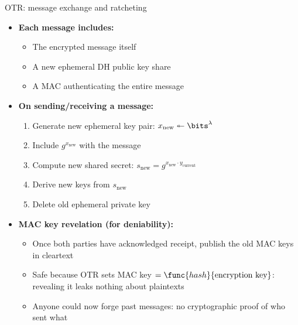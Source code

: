\ifdefined\PRESENTATION\else\PassOptionsToClass{handout}{beamer}\fi\documentclass[aspectratio=169, lualatex]{beamer}
\begin{document}
\begin{frame}{OTR: message exchange and ratcheting}
	\begin{itemize}
		\item \textbf{Each message includes:}
		      \begin{itemize}
			      \item The encrypted message itself
			      \item A new ephemeral DH public key share
			      \item A MAC authenticating the entire message
		      \end{itemize}
		\item \textbf{On sending/receiving a message:}
		      \begin{enumerate}
			      \item Generate new ephemeral key pair: $x_{\text{new}} \twoheadleftarrow \bits^{\lambda}$
			      \item Include $g^{x_{\text{new}}}$ with the message
			      \item Compute new shared secret: $s_{\text{new}} = g^{x_{\text{new}} \cdot y_{\text{current}}}$
			      \item Derive new keys from $s_{\text{new}}$
			      \item Delete old ephemeral private key
		      \end{enumerate}
		\item \textbf{MAC key revelation (for deniability):}
		      \begin{itemize}
			      \item Once both parties have acknowledged receipt, publish the old MAC keys in cleartext
			      \item Safe because OTR sets MAC key $= \func{hash}{\text{encryption key}}$: revealing it leaks nothing about plaintexts
			      \item Anyone could now forge past messages: no cryptographic proof of who sent what
		      \end{itemize}
	\end{itemize}
\end{frame}
\end{document}
